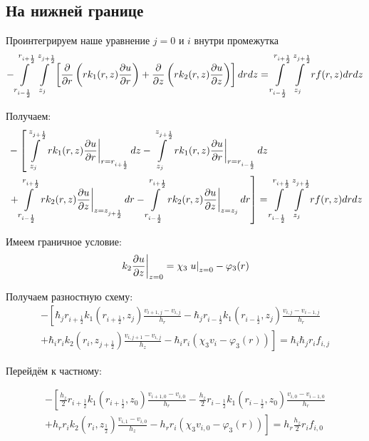 \subsection{На нижней границе}
Проинтегрируем наше уравнение $ j = 0 $ и $ i $ внутри промежутка
\[
  - \int\limits^{r_{i +\frac{1}{2}}}_{r_{i -\frac{1}{2}}} \int\limits^{z_{j +\frac{1}{2}}}_{z_{j }} \left [ \pdv{}{r} \left ( r k_1(r, z) \pdv{u}{r} \right ) 
  + \pdv{}{z} \left ( rk_2(r, z)\pdv{u}{z} \right ) \right ] drdz = \int\limits^{r_{i +\frac{1}{2}}}_{r_{i -\frac{1}{2}}} \int\limits^{z_{j +\frac{1}{2}}}_{z_{j }} rf(r, z) dr dz
\]

Получаем:
\begin{align*}
  &- \left [
   \int\limits^{z_{j +\frac{1}{2}}}_{z_{j }}  \left . r k_1(r, z) \pdv{u}{r} \right \vert_{r = r_{i + \frac{1}{2}}} dz
  - \int\limits^{z_{j +\frac{1}{2}}}_{z_{j }} \left . r k_1(r, z) \pdv{u}{r} \right \vert_{r = r_{i - \frac{1}{2}}} dz
  \right . \\
  &\left . + \int\limits^{r_{i+\frac{1}{2}}}_{r_{i-\frac{1}{2}}} \left . rk_2(r, z)\pdv{u}{z} \right \vert_{z = z_{j + \frac{1}{2}}} dr
  - \int\limits^{r_{i+\frac{1}{2}}}_{r_{i-\frac{1}{2}}} \left . rk_2(r, z)\pdv{u}{z} \right \vert_{z = z_{j}} dr
  \right ] = \int\limits^{r_{i +\frac{1}{2}}}_{r_{i -\frac{1}{2}}} \int\limits^{z_{j +\frac{1}{2}}}_{z_{j }} rf(r, z) dr dz
\end{align*}

Имеем граничное условие:
\[
  \left . k_2 \pdv{u}{z} \right \vert_{z=0} = \chi_3 \left . u \right \vert_{z=0} - \varphi_3(r)
\]

Получаем разностную схему:
\begin{align*}
  - \left [ 
  \hbar_j r_{i+\frac{1}{2}} k_1(r_{i+\frac{1}{2}}, z_j) \frac{v_{i+1, j} - v_{i, j}}{h_{r}}
  - \hbar_j r_{i-\frac{1}{2}} k_1(r_{i-\frac{1}{2}}, z_j) \frac{v_{i, j} - v_{i - 1, j}}{h_{r}}
  \right . \\
  \left .
  + \hbar_i r_{i} k_2(r_i, z_{j+\frac{1}{2}}) \frac{v_{i, j + 1} - v_{i, j}}{h_{z}}
  - \hbar_i r_i (\chi_3 v_i - \varphi_3(r))
  \right ]  = \hbar_i \hbar_j r_i f_{i, j}
\end{align*}

Перейдём к частному:

\begin{align*}
  - \left [ 
  \frac{h_z}{2} r_{i+\frac{1}{2}} k_1(r_{i+\frac{1}{2}}, z_0) \frac{v_{i+1, 0} - v_{i, 0}}{h_{r}}
  - \frac{h_z}{2} r_{i-\frac{1}{2}} k_1(r_{i-\frac{1}{2}}, z_0) \frac{v_{i, 0} - v_{i - 1, 0}}{h_{r}}
  \right . \\
  \left .
  + h_r r_{i} k_2(r_i, z_{\frac{1}{2}}) \frac{v_{i, 1} - v_{i, 0}}{h_{z}}
  - h_r r_i (\chi_3 v_{i, 0} - \varphi_3(r))
  \right ]  = h_r \frac{h_z}{2} r_i f_{i, 0}
\end{align*}

